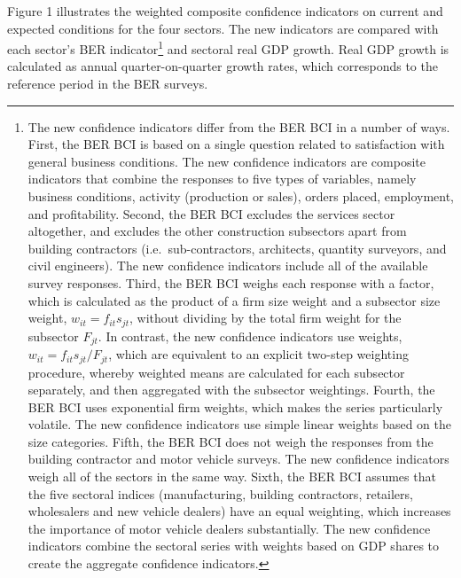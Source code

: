 \documentclass[11pt,]{article}
\let\rmarkdownfootnote\footnote%
\def\footnote{\protect\rmarkdownfootnote}
\begin{document}
Figure 1 illustrates the weighted composite confidence indicators on
current and expected conditions for the four sectors. The new indicators
are compared with each sector's BER indicator\footnote{The new
  confidence indicators differ from the BER BCI in a number of ways.
  First, the BER BCI is based on a single question related to
  satisfaction with general business conditions. The new confidence
  indicators are composite indicators that combine the responses to five
  types of variables, namely business conditions, activity (production
  or sales), orders placed, employment, and profitability. Second, the
  BER BCI excludes the services sector altogether, and excludes the
  other construction subsectors apart from building contractors
  (i.e.~sub-contractors, architects, quantity surveyors, and civil
  engineers). The new confidence indicators include all of the available
  survey responses. Third, the BER BCI weighs each response with a
  factor, which is calculated as the product of a firm size weight and a
  subsector size weight, \(w_{it} = f_{it} s_{jt}\), without dividing by
  the total firm weight for the subsector \(F_{jt}\). In contrast, the
  new confidence indicators use weights,
  \(w_{it} = f_{it} s_{jt} / F_{jt}\), which are equivalent to an
  explicit two-step weighting procedure, whereby weighted means are
  calculated for each subsector separately, and then aggregated with the
  subsector weightings. Fourth, the BER BCI uses exponential firm
  weights, which makes the series particularly volatile. The new
  confidence indicators use simple linear weights based on the size
  categories. Fifth, the BER BCI does not weigh the responses from the
  building contractor and motor vehicle surveys. The new confidence
  indicators weigh all of the sectors in the same way. Sixth, the BER
  BCI assumes that the five sectoral indices (manufacturing, building
  contractors, retailers, wholesalers and new vehicle dealers) have an
  equal weighting, which increases the importance of motor vehicle
  dealers substantially. The new confidence indicators combine the
  sectoral series with weights based on GDP shares to create the
  aggregate confidence indicators.} and sectoral real GDP growth. Real
GDP growth is calculated as annual quarter-on-quarter growth rates,
which corresponds to the reference period in the BER surveys.
\end{document}
